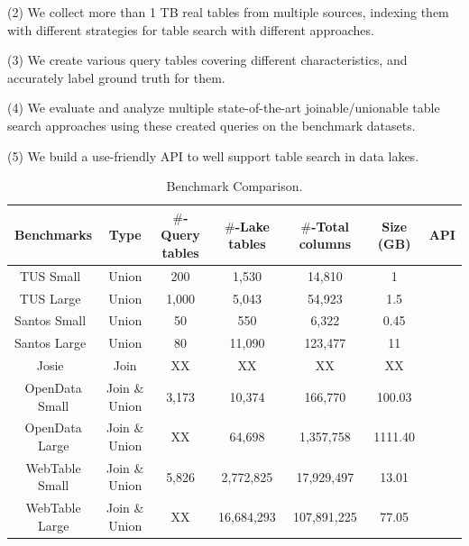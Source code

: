 \noindent (2) We collect more than 1 TB real tables from multiple sources, indexing them with different strategies for table search with different approaches.  

\noindent (3) We create various query tables covering different characteristics, and accurately label ground truth for them.

\noindent (4) We evaluate and analyze multiple state-of-the-art joinable/unionable table search approaches using these created queries on the benchmark datasets.

\noindent (5) We build a use-friendly API to well support table search in data lakes. 


\begin{table}[t]
	\centering
	\caption{Benchmark Comparison.}
	\setlength{\arrayrulewidth}{0.5pt} %
	\begin{tabular}{|c|c|c|c|c|c|c|}
		\hline
		\centering
		Benchmarks & Type & $\#$-Query tables & $\#$-Lake tables & $\#$-Total columns & Size (GB) &  API \\
		\hline  
		TUS Small~\cite{TUS}& Union  & 200 & 1,530 & 14,810 & 1 & \XSolidBrush \\
		\hline
		TUS Large~\cite{TUS}& Union  & 1,000 & 5,043 & 54,923 & 1.5 & \XSolidBrush \\
		\hline
		Santos Small~\cite{Santos}& Union  & 50 & 550 & 6,322 & 0.45 & \XSolidBrush \\
		\hline
		Santos Large~\cite{Santos}& Union  & 80 & 11,090 & 123,477 & 11 & \XSolidBrush  \\
		\hline
		Josie~\cite{Josie}& Join  & XX & XX  & XX  & XX &  \XSolidBrush \\
		\hline
		\rowcolor{gray!40} 
		OpenData Small & Join \& Union  & 3,173 & 10,374  & 166,770  & 100.03 & \Checkmark  \\
		\hline
		\rowcolor{gray!40}
		OpenData Large & Join \& Union  & XX & 64,698  & 1,357,758  & 1111.40 & \Checkmark  \\
		\hline
		\rowcolor{gray!40}
		WebTable Small & Join \& Union  & 5,826 & 2,772,825  & 17,929,497  & 13.01 & \Checkmark\\
		\hline
		\rowcolor{gray!40}
		WebTable Large & Join \& Union  & XX & 16,684,293  & 107,891,225  & 77.05 &\Checkmark \\
		\hline
	\end{tabular}
	\label{Table:benchmarks}
	
\end{table}
